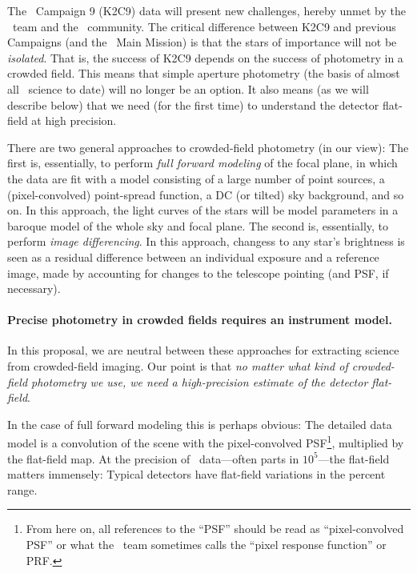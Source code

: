 \documentclass[12pt,preprint]{aastex}
\begin{document}
The \ktwo\ Campaign 9 (K2C9) data will present new challenges, hereby
unmet by the \ktwo\ team and the \kepler\ community.
The critical difference between K2C9 and previous Campaigns (and the
\kepler\ Main Mission) is that the stars of importance will not be
\emph{isolated}.
That is, the success of K2C9 depends on the success of photometry in a
crowded field.
This means that simple aperture photometry (the basis of almost all
\kepler\ science to date) will no longer be an option.
It also means (as we will describe below) that we need (for the first
time) to understand the detector flat-field at high precision.

There are two general approaches to crowded-field photometry (in our view):
The first is, essentially, to perform \emph{full forward modeling} of the
focal plane, in which the data are fit with a model consisting of a
large number of point sources, a (pixel-convolved) point-spread
function, a DC (or tilted) sky background, and so on.
In this approach, the light curves of the stars will be model parameters
in a baroque model of the whole sky and focal plane.
The second is, essentially, to perform \emph{image differencing}.
In this approach, changess to any star's brightness is seen as a
residual difference between an individual exposure and a reference
image, made by accounting for changes to the telescope pointing (and
PSF, if necessary).

\paragraph{Precise photometry in crowded fields requires an instrument model.}

In this proposal, we are neutral between these approaches for extracting
science from crowded-field imaging.
Our point is that \emph{no matter what kind of crowded-field photometry
we use, we need a high-precision estimate of the detector flat-field}.

In the case of full forward modeling this is perhaps obvious:
The detailed data model is a convolution of the scene with the
pixel-convolved PSF\footnote{From here on, all references to the
  ``PSF'' should be read as ``pixel-convolved PSF'' or what the
  \kepler\ team sometimes calls the ``pixel response function'' or
  PRF.}, multiplied by the flat-field map.
At the precision of \kepler\ data---often parts in $10^5$---the
flat-field matters immensely:
Typical detectors have flat-field variations in the percent range.
\end{document}
